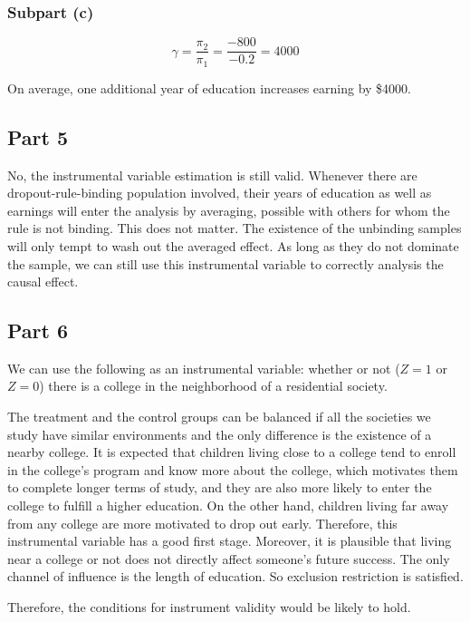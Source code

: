 \documentclass{article}
\begin{document}
\subsubsection{Subpart (c)}
\begin{equation*}
\gamma=\frac{\pi_2}{\pi_1}=\frac{-800}{-0.2}=4000
\end{equation*}

On average, one additional year of education increases earning by \$4000.

\subsection{Part 5}
No, the instrumental variable estimation is still valid. Whenever there are dropout-rule-binding population involved, their years of education as well as earnings will enter the analysis by averaging, possible with others for whom the rule is not binding. This does not matter. The existence of the unbinding samples will only tempt to wash out the averaged effect. As long as they do not dominate the sample, we can still use this instrumental variable to correctly analysis the causal effect.

\subsection{Part 6}
We can use the following as an instrumental variable: whether or not ($Z=1$ or $Z=0$) there is a college in the neighborhood of a residential society.

The treatment and the control groups can be balanced if all the societies we study have similar environments and the only difference is the existence of a nearby college. It is expected that children living close to a college tend to enroll in the college's program and know more about the college, which motivates them to complete longer terms of study, and they are also more likely to enter the college to fulfill a higher education. On the other hand, children living far away from any college are more motivated to drop out early. Therefore, this instrumental variable has a good first stage. Moreover, it is plausible that living near a college or not does not directly affect someone's future success. The only channel of influence is the length of education. So exclusion restriction is satisfied.

Therefore, the conditions for instrument validity would be likely to hold.
\end{document}

